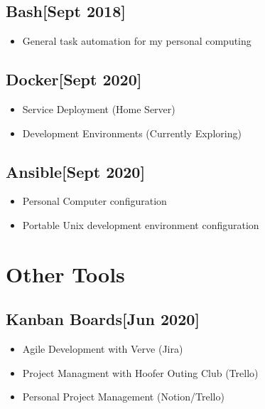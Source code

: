 \documentclass{article}
\begin{document}
    \subsection{\textbf{Bash}\hfill{[Sept 2018]}}
        \begin{itemize}
            \item General task automation for my personal computing
        \end{itemize}

    \subsection{\textbf{Docker}\hfill{[Sept 2020]}}
        \begin{itemize}
            \item Service Deployment (Home Server)
            \item Development Environments (Currently Exploring)
        \end{itemize}

    \subsection{\textbf{Ansible}\hfill{[Sept 2020]}}
        \begin{itemize}
            \item Personal Computer configuration
            \item Portable Unix development environment configuration
        \end{itemize}

\section{Other Tools}

    \subsection{\textbf{Kanban Boards}\hfill{[Jun 2020]}}
        \begin{itemize}
            \item Agile Development with Verve (Jira)
            \item Project Managment with Hoofer Outing Club (Trello)
            \item Personal Project Management (Notion/Trello)
        \end{itemize}
\end{document}
